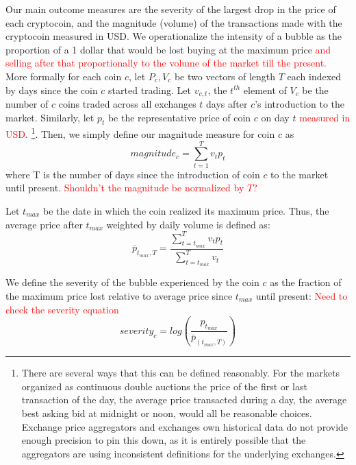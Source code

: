 Our main outcome measures are the severity of the largest drop in the price of each cryptocoin, and the magnitude (volume) of the transactions made with the cryptocoin measured in USD.
We operationalize the intensity of a bubble as the proportion of a 1 dollar that would be lost buying at the maximum price \textcolor{red}{and selling after that proportionally to the volume of the market till the present.}
More formally for each coin $c$, let $P_c,V_c$ be two vectors of length $T$ each indexed by days since the coin $c$ started trading.
Let $v_{c,t}$, the $t^{th}$ element of $V_c$ be the number of $c$ coins traded across all exchanges $t$ days after $c$'s introduction to the market. 
Similarly, let $p_t$ be the representative price of coin $c$ on day $t$ \textcolor{red}{measured in USD}. \footnote{There are several ways that this can be defined reasonably. For the markets organized as continuous double auctions the price of the first or last transaction of the day,  the average price transacted during a day, the average best asking bid at midnight or noon, would all be reasonable choices. Exchange price aggregators and exchanges own historical data do not provide enough precision to pin this down, as it is entirely possible that the aggregators are using inconsistent definitions for the underlying exchanges.}. Then, we simply define our magnitude measure for coin $c$ as
\begin{equation}
magnitude_{c} = \sum_{t=1}^{T} v_t  p_t
\end{equation}
where T is the number of days since the introduction of coin $c$ to the market until present. \textcolor{red}{Shouldn't the magnitude be normalized by $T$?}


Let $t_{max}$ be the date in which the coin realized its maximum price. Thus, the average price after $t_{max}$ weighted by daily volume is defined as:
\begin{equation}
\bar{p}_{t_{max},T} = \frac{\sum_{t=t_{max}}^{T} v_t p_t} {\sum_{t=t_{max}}^{T} v_t}
\end{equation}

We define the severity of the bubble experienced by the coin $c$ as the fraction of the maximum price lost relative to average price since $t_{max}$ until present: \textcolor{red}{Need to check the severity equation}
\begin{equation}
severity_{c} = log(\frac{ p_{t_{max}}} {\bar{p}_{(t_{max},T)} })
\end{equation}
